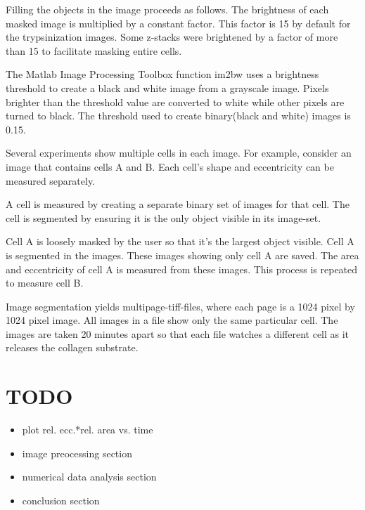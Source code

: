 \documentclass[ twocolumn,notitlepage]{ revtex4-1}
\begin{document}
Filling the objects in the image proceeds as follows. The brightness of each masked image is multiplied by a constant factor. This factor is 15 by default for the trypsinization images. Some z-stacks were brightened by a factor of more than 15 to facilitate masking entire cells.

The Matlab Image Processing Toolbox function im2bw uses a brightness threshold to create a black and white image from a grayscale image. Pixels brighter than the threshold value are converted to white while other pixels are turned to black. The threshold used to create binary(black and white) images is 0.15.

Several experiments show multiple cells in each image. For example, consider an image that contains cells A and B. Each cell's shape and eccentricity can be measured separately. 

A cell is measured by creating a separate binary set of images for that cell. The cell is segmented by ensuring it is the only object visible in its image-set.

Cell A is loosely masked by the user so that it's the largest object visible. Cell A is segmented in the images. These images showing only cell A are saved. The area and eccentricity of cell A is measured from these images. This process is repeated to measure cell B.

Image segmentation yields multipage-tiff-files, where each page is a 1024 pixel by 1024 pixel image. All images in a file show only the same particular cell. The images are taken 20 minutes apart so that each file watches a different cell as it releases the collagen substrate.

\section{TODO}
\begin{itemize}
\item plot rel. ecc.*rel. area vs. time
\item image preocessing section
\item numerical data analysis section
\item conclusion section
\end{itemize}

%
%
\end{document}
